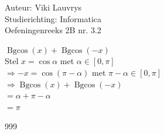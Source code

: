 \documentclass[a4paper]{article}
\begin{document}
  
\noindent \large Auteur: Viki Lauvrys        \\
\noindent \large Studierichting: Informatica \\
\noindent \large Oefeningenreeks 2B nr. 3.2 \\

\medskip

\normalsize

$ \operatorname{Bgcos}(x) + \operatorname{Bgcos}(-x) $ \\

Stel $ x = \cos \alpha $ met $ \alpha \in [0, \pi] $ \\

$\Rightarrow -x = \cos(\pi - \alpha) $ met $ \pi - \alpha \in [0, \pi] $ \\

$ \Rightarrow \operatorname{Bgcos}(x) + \operatorname{Bgcos}(-x) $ \\

$ = \alpha + \pi - \alpha $ \\

$ = \pi $ \\

\begin{thebibliography}{999}
\end{thebibliography}
\end{document}
